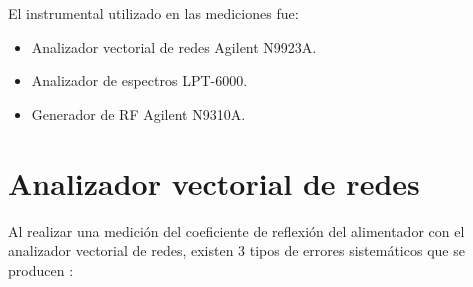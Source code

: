 El instrumental utilizado en las mediciones fue:
\begin{itemize}
\item Analizador vectorial de redes Agilent N9923A.
\item Analizador de espectros LPT-6000.
\item Generador de RF Agilent N9310A.
\end{itemize}

\section{Analizador vectorial de redes}

Al realizar una medición del coeficiente de reflexión del alimentador con el analizador vectorial de redes, existen 3 tipos de errores sistemáticos que se producen \cite{Agilent_vna_cal}:

